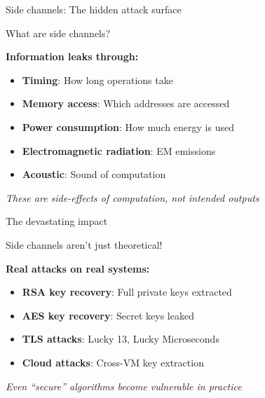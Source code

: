 \documentclass[aspectratio=169, lualatex, handout]{beamer}
\begin{document}
\begin{frame}{Side channels: The hidden attack surface}
	\begin{center}
		\Large
		What are side channels?
	\end{center}
	\vspace{1em}
	\textbf{Information leaks through:}
	\begin{itemize}
		\item \textbf{Timing}: How long operations take
		\item \textbf{Memory access}: Which addresses are accessed
		\item \textbf{Power consumption}: How much energy is used
		\item \textbf{Electromagnetic radiation}: EM emissions
		\item \textbf{Acoustic}: Sound of computation
	\end{itemize}
	\vspace{0.5em}
	\begin{center}
		\textit{These are side-effects of computation, not intended outputs}
	\end{center}
\end{frame}

\begin{frame}{The devastating impact}
	\begin{center}
		\Large
		Side channels aren't just theoretical!
	\end{center}
	\vspace{1em}
	\textbf{Real attacks on real systems:}
	\begin{itemize}
		\item \textbf{RSA key recovery}: Full private keys extracted
		\item \textbf{AES key recovery}: Secret keys leaked
		\item \textbf{TLS attacks}: Lucky 13, Lucky Microseconds
		\item \textbf{Cloud attacks}: Cross-VM key extraction
	\end{itemize}
	\vspace{1em}
	\begin{center}
		\textit{Even ``secure'' algorithms become vulnerable in practice}
	\end{center}
\end{frame}
\end{document}
